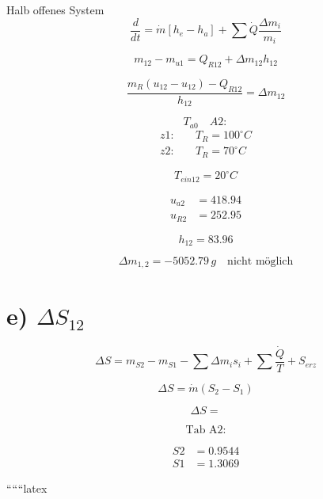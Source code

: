 Halb offenes System
\[
\frac{d}{dt} = \dot{m} [h_{e} - h_{a}] + \sum \dot{Q} \frac{\Delta m_{i}}{m_{i}}
\]

\[
m_{12} - m_{u1} = Q_{R12} + \Delta m_{12} h_{12}
\]

\[
\frac{m_{R} (u_{12} - u_{12}) - Q_{R12}}{h_{12}} = \Delta m_{12}
\]

\[
T_{a0} \quad A2:
\]
\[
\begin{aligned}
z1: & \quad T_{R} = 100^\circ C \\
z2: & \quad T_{R} = 70^\circ C
\end{aligned}
\]

\[
T_{ein12} = 20^\circ C
\]

\[
\begin{aligned}
u_{a2} & = 418.94 \\
u_{R2} & = 252.95
\end{aligned}
\]

\[
h_{12} = 83.96
\]

\[
\Delta m_{1,2} = -5052.79 \, g \quad \text{nicht möglich}
\]

\section*{e) $\Delta S_{12}$}

\[
\Delta S = m_{S2} - m_{S1} - \sum \Delta m_{i} s_{i} + \sum \frac{\dot{Q}}{T} + S_{erz}
\]

\[
\Delta S = \dot{m} (S_{2} - S_{1})
\]

\[
\Delta S =
\]

\[
\text{Tab A2:}
\]

\[
\begin{aligned}
S2 & = 0.9544 \\
S1 & = 1.3069
\end{aligned}
\]

``````latex


